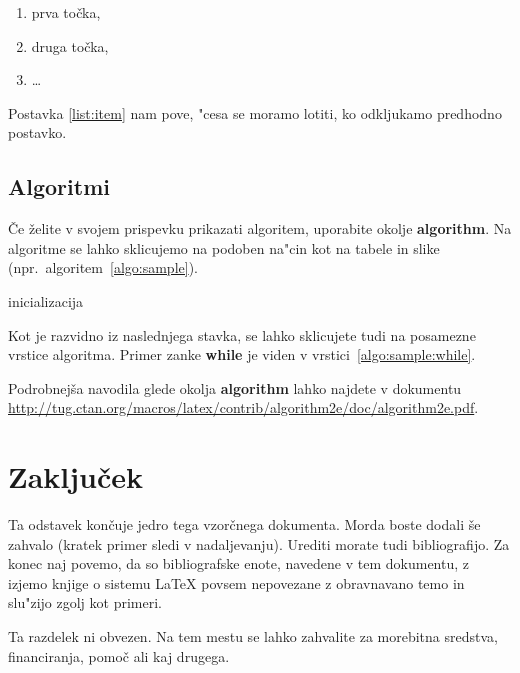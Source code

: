 \documentclass[sigconf,nonacm]{acmart}
\begin{document}
\begin{enumerate}
    \item prva točka,
    \item\label{list:item} druga točka,
    \item \ldots
\end{enumerate}

Postavka \ref{list:item} nam pove, "cesa se moramo lotiti, ko odkljukamo
predhodno postavko.

\subsection{Algoritmi}

Če želite v svojem prispevku prikazati algoritem, uporabite okolje
\textbf{algorithm}.  Na algoritme se lahko sklicujemo na podoben na"cin kot na
tabele in slike (npr.\ algoritem~\ref{algo:sample}).

\begin{algorithm}
    \SetAlgoLined
    inicializacija\;
    \caption{Kako pisati algoritme.}
    \label{algo:sample}
\end{algorithm}

Kot je razvidno iz naslednjega stavka, se lahko sklicujete tudi na posamezne
vrstice algoritma.  Primer zanke \textbf{while} je viden v
vrstici~\ref{algo:sample:while}.

Podrobnejša navodila glede okolja
\textbf{algorithm} lahko najdete v dokumentu
\url{http://tug.ctan.org/macros/latex/contrib/algorithm2e/doc/algorithm2e.pdf}.

\section{Zaključek}

Ta odstavek končuje jedro tega vzorčnega dokumenta.  Morda boste dodali še
zahvalo (kratek primer sledi v nadaljevanju).  Urediti morate tudi
bibliografijo.  Za konec naj povemo, da so bibliografske enote, navedene v tem
dokumentu, z izjemo knjige o sistemu \LaTeX{} povsem nepovezane z obravnavano
temo in slu"zijo zgolj kot primeri.

\begin{acks}
    Ta razdelek ni obvezen.  Na tem mestu se lahko zahvalite za morebitna
    sredstva, financiranja, pomoč ali kaj drugega.
\end{acks}



\end{document}
